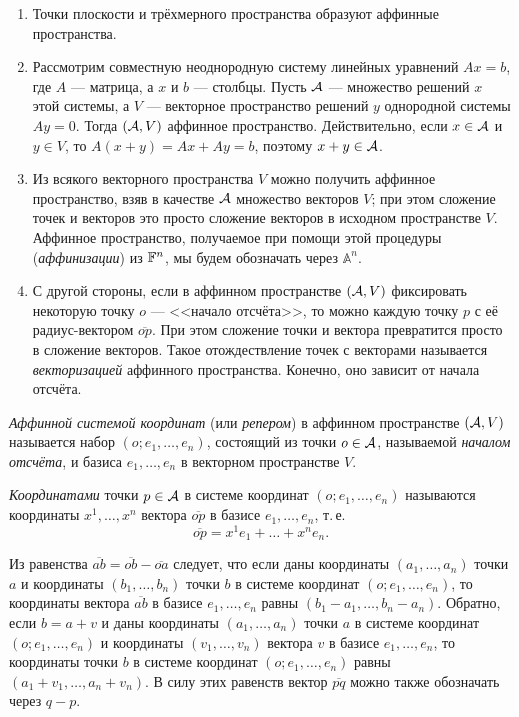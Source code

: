 \begin{example}
    \begin{enumerate}[nolistsep]
        \item Точки плоскости и трёхмерного пространства образуют аффинные пространства.
        \item Рассмотрим совместную неоднородную систему линейных уравнений $Ax = b$, где $A$ --- матрица, а $x$ и $b$ --- столбцы. Пусть $\mathcal{A}$ --- множество решений $x$ этой системы, а $V$ --- векторное пространство решений $y$ однородной системы $Ay = 0$. Тогда $(\mathcal{A}, V)$ аффинное пространство. Действительно, если $x \in \mathcal{A}$ и $y \in V$, то $A(x + y) = Ax + Ay = b$, поэтому $x + y \in \mathcal{A}$.
        \item Из всякого векторного пространства $V$ можно получить аффинное пространство, взяв в качестве $\mathcal{A}$ множество векторов $V$; при этом сложение точек и векторов это просто сложение векторов в исходном пространстве $V$. Аффинное пространство, получаемое при помощи этой процедуры (\textit{аффинизации}) из $\mathbb{F}^n$, мы будем обозначать через $\mathbb{A}^n$.
        \item С другой стороны, если в аффинном пространстве $(\mathcal{A}, V)$ фиксировать некоторую точку $o$ --- <<начало отсчёта>>, то можно каждую точку $p$ с её радиус-вектором $\overline{op}$. При этом сложение точки и вектора превратится просто в сложение векторов. Такое отождествление точек с векторами называется \textit{векторизацией} аффинного пространства. Конечно, оно зависит от начала отсчёта.
    \end{enumerate}
\end{example}

\begin{definition}
    \textit{Аффинной системой координат} (или \textit{репером}) в аффинном пространстве $(\mathcal{A}, V)$ называется набор $(o; e_1, \ldots, e_n)$, состоящий из точки $o \in \mathcal{A}$, называемой \textit{началом отсчёта}, и базиса $e_1, \ldots, e_n$ в векторном пространстве $V$.

    \textit{Координатами} точки $p \in \mathcal{A}$ в системе координат $(o; e_1, \ldots, e_n)$ называются координаты $x^1, \ldots, x^n$ вектора $\overline{op}$ в базисе $e_1, \ldots, e_n$, т.\,е.
    \[
        \overline{op} = x^1e_1 + \ldots + x^ne_n.
    \]
\end{definition}

Из равенства $\overline{ab} = \overline{ob} - \overline{oa}$ следует, что если даны координаты $(a_1, \ldots, a_n)$ точки $a$ и координаты $(b_1, \ldots, b_n)$ точки $b$ в системе координат $(o; e_1, \ldots, e_n)$, то координаты вектора $\overline{ab}$ в базисе $e_1, \ldots, e_n$ равны $(b_1 - a_1, \ldots, b_n - a_n)$. Обратно, если $b = a + v$ и даны координаты $(a_1, \ldots, a_n)$ точки $a$ в системе координат $(o; e_1, \ldots, e_n)$ и координаты $(v_1, \ldots, v_n)$ вектора $v$ в базисе $e_1, \ldots, e_n$, то координаты точки $b$ в системе координат $(o; e_1, \ldots, e_n)$ равны $(a_1 + v_1, \ldots, a_n + v_n)$. В силу этих равенств вектор $\overline{pq}$ можно также обозначать через $q - p$.


